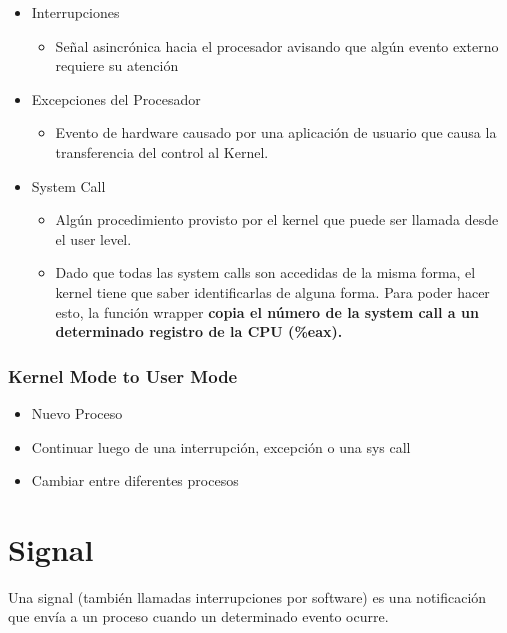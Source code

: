 \documentclass{article}
\begin{document}
\begin{itemize}
\item
  Interrupciones

  \begin{itemize}
  \item
    Señal asincrónica hacia el procesador avisando que algún evento
    externo requiere su atención
  \end{itemize}
\item
  Excepciones del Procesador

  \begin{itemize}
  \item
    Evento de hardware causado por una aplicación de usuario que causa
    la transferencia del control al Kernel.
  \end{itemize}
\item
  System Call

  \begin{itemize}
  \item
    Algún procedimiento provisto por el kernel que puede ser llamada
    desde el user level.
  \item
    Dado que todas las system calls son accedidas de la misma forma, el
    kernel tiene que saber identificarlas de alguna forma. Para poder
    hacer esto, la función wrapper \textbf{copia el número de la system
    call a un determinado registro de la CPU (\%eax).}
  \end{itemize}
\end{itemize}

\subsubsection{Kernel Mode to User Mode}\label{kernel-mode-to-user-mode}

\begin{itemize}
\item
  Nuevo Proceso
\item
  Continuar luego de una interrupción, excepción o una sys call
\item
  Cambiar entre diferentes procesos
\end{itemize}

\section{Signal}\label{signal}

Una signal (también llamadas interrupciones por software) es una
notificación que envía a un proceso cuando un determinado evento ocurre.
\end{document}
